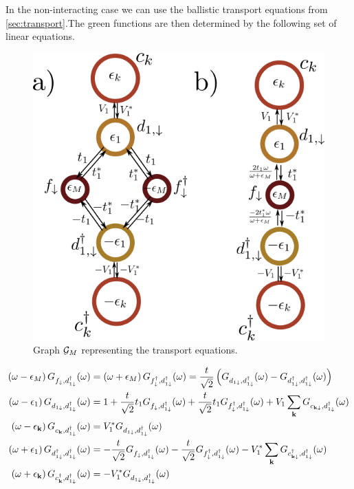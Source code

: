 In the non-interacting case we can use the ballistic transport equations from \ref{sec:transport}.The green functions are then determined by the following set of linear equations. 

\begin{figure}[t]
\centering
\includegraphics[scale=0.5]{IMAGES/Majorana/Grenn-Majorana.png}
\caption{ Graph $\mathcal{G}_M$ representing the transport equations.  \label{fig:green-M-QD} \protect{}}
\end{figure}


\begin{align}
    \left(\omega-\epsilon_{M}\right)G_{f_{\downarrow},d_{1\downarrow}^{\dagger}}(\omega)&=\left(\omega+\epsilon_{M}\right)G_{f_{\downarrow}^{\dagger},d_{1\downarrow}^{\dagger}}(\omega)=\frac{t}{\sqrt{2}}\left(G_{d_{1\downarrow},d_{1\downarrow}^{\dagger}}(\omega)-G_{d_{1\downarrow}^{\dagger},d_{1\downarrow}^{\dagger}}(\omega)\right)\\
    \left(\omega-\epsilon_{1}\right)G_{d_{1\downarrow},d_{1\downarrow}^{\dagger}}(\omega)&=1+\frac{t}{\sqrt{2}}t_{1}G_{f_{\downarrow},d_{1\downarrow}^{\dagger}}(\omega)+\frac{t}{\sqrt{2}}t_{1}G_{f_{\downarrow}^{\dagger},d_{1\downarrow}^{\dagger}}(\omega)+V_{1}\sum_{\mathbf{k}}G_{c_{\mathbf{k\downarrow}},d_{1\downarrow}^{\dagger}}(\omega)\\
    \left(\omega-\epsilon_{\mathbf{k}}\right)G_{c_{\mathbf{k}},d_{1\downarrow}^{\dagger}}(\omega)&=V_{1}^{*}G_{d_{1\downarrow},d_{1\downarrow}^{\dagger}}(\omega)\\
    \left(\omega+\epsilon_{1}\right)G_{d_{1\downarrow}^{\dagger},d_{1\downarrow}^{\dagger}}(\omega)&=-\frac{t}{\sqrt{2}}G_{f_{\downarrow},d_{1\downarrow}^{\dagger}}(\omega)-\frac{t}{\sqrt{2}}G_{f_{\downarrow}^{\dagger},d_{1\downarrow}^{\dagger}}(\omega)-V_{1}^{*}\sum_{\mathbf{k}}G_{c_{\mathbf{k\downarrow}}^{\dagger},d_{1\downarrow}^{\dagger}}(\omega)\\
    \left(\omega+\epsilon_{\mathbf{k}}\right)G_{c^\dagger_{\mathbf{k}},d_{1\downarrow}^{\dagger}}(\omega)&=-V_{1}^{*}G_{d_{1\downarrow},d_{1\downarrow}^{\dagger}}(\omega)
\end{align}

